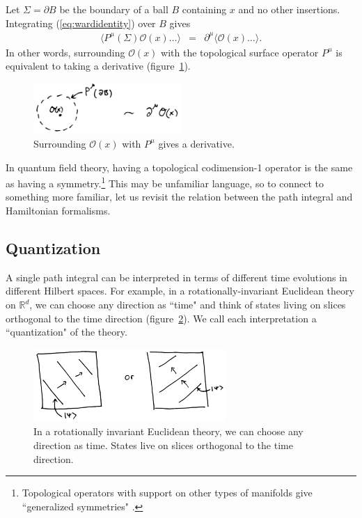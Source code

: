 \documentclass[11pt]{ws-rv9x6}
\newcommand\be{\begin{eqnarray}}
\newcommand\ee{\end{eqnarray}}
\newcommand\cO{\mathcal{O}}
\newcommand\ptl\partial
\newcommand\<\langle
\renewcommand\>\rangle
\newcommand\R{\mathbb{R}}
\renewcommand\.{\cdot}
\begin{document}
Let $\Sigma=\ptl B$ be the boundary of a ball $B$ containing $x$ and no other insertions. Integrating (\ref{eq:wardidentity}) over $B$ gives
\be
\label{eq:integratedwardidentity}
\<P^\mu(\Sigma)\cO(x)\dots\> &=& \ptl^\mu\<\cO(x)\dots\>.
\ee
In other words, surrounding $\cO(x)$ with the topological surface operator $P^\mu$ is equivalent to taking a derivative (figure~\ref{fig:surroundoperator}).

\begin{figure}
\begin{center}
\includegraphics[width=0.5\textwidth]{surroundoperator.jpg}
\end{center}
\caption{\label{fig:surroundoperator} Surrounding $\cO(x)$ with $P^\mu$ gives a derivative.}
\end{figure}

In quantum field theory, having a topological codimension-1 operator is the same as having a symmetry.\footnote{Topological operators with support on other types of manifolds give ``generalized symmetries" \cite{Gaiotto:2014kfa}.}  This may be unfamiliar language, so to connect to something more familiar, let us revisit the relation between the path integral and Hamiltonian formalisms.


\subsection{Quantization}
\label{sec:quantization}

A single path integral can be interpreted in terms of different time evolutions in different Hilbert spaces.  For example, in a rotationally-invariant Euclidean theory on $\R^d$, we can choose any direction as ``time" and think of states living on slices orthogonal to the time direction (figure~\ref{fig:differentquantizations}).  We call each interpretation a ``quantization" of the theory.

\begin{figure}
\begin{center}
\includegraphics[width=0.65\textwidth]{differentquantizations.jpg}
\end{center}
\caption{\label{fig:differentquantizations} In a rotationally invariant Euclidean theory, we can choose any direction as time.  States live on slices orthogonal to the time direction.}
\end{figure}
\end{document}
